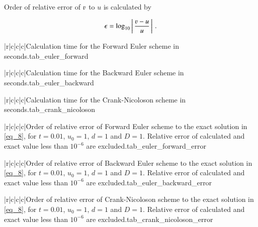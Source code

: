 \documentclass[11pt,english,a4paper]{article}
\begin{document}
\begin{flushleft}
Order of relative error of $\varv$ to $u$ is calculated by

\begin{align*}
\epsilon = \log_{10}\abs{\frac{\varv - u}{u}} \,.
\end{align*}

\begin{tabell}{|r|c|c|c|}{\small}{}{}{Calculation time for the Forward Euler scheme in seconds.}{tab_euler_forward}
\end{tabell}

\begin{tabell}{|r|c|c|c|}{\small}{}{}{Calculation time for the Backward Euler scheme in seconds.}{tab_euler_backward}
\end{tabell}

\begin{tabell}{|r|c|c|c|}{\small}{}{}{Calculation time for the Crank-Nicoloson scheme in seconds.}{tab_crank_nicoloson}
\end{tabell}

\begin{tabell}{|r|c|c|c|}{\small}{}{}{Order of relative error of Forward Euler scheme to the exact solution in \eqref{eq_8}, for $t=0.01$, $u_0 = 1$, $d = 1$ and $D = 1$. Relative error of calculated and exact value less than $10^{-6}$ are excluded.}{tab_euler_forward_error}
\end{tabell}

\begin{tabell}{|r|c|c|c|}{\small}{}{}{Order of relative error of Backward Euler scheme to the exact solution in \eqref{eq_8}, for $t=0.01$, $u_0 = 1$, $d = 1$ and $D = 1$. Relative error of calculated and exact value less than $10^{-6}$ are excluded.}{tab_euler_backward_error}
\end{tabell}

\begin{tabell}{|r|c|c|c|}{\small}{}{}{Order of relative error of Crank-Nicoloson scheme to the exact solution in \eqref{eq_8}, for $t=0.01$, $u_0 = 1$, $d = 1$ and $D = 1$. Relative error of calculated and exact value less than $10^{-6}$ are excluded.}{tab_crank_nicoloson_error}
\end{tabell}


\end{flushleft}
\end{document}
